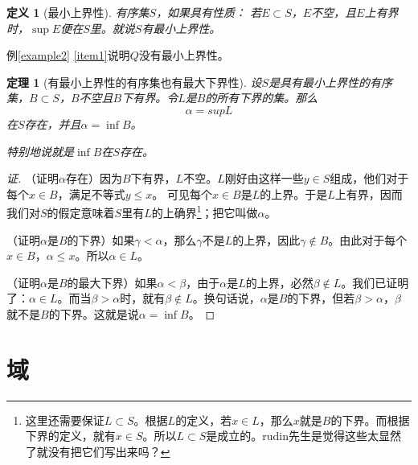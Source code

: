 \documentclass[UTF8]{ctexbook}
\newtheorem{definition}{定义}[chapter]
\newtheorem{theorem}{定理}[chapter]
\begin{document}
\begin{definition}[最小上界性]
有序集$S$，如果具有性质：
若$E \subset S$，$E$不空，且$E$上有界时，$\sup{E}$便在$S$里。就说$S$有最小上界性。
\end{definition}
例\ref{example2} \ref{item1}说明$Q$没有最小上界性。

\begin{theorem}[有最小上界性的有序集也有最大下界性]
设$S$是具有最小上界性的有序集，$B \subset S$，$B$不空且$B$下有界。令$L$是$B$的所有下界的集。那么$$\alpha = sup{L}$$在$S$存在，并且$\alpha = \inf{B}$。

特别地说就是$\inf{B}$在$S$存在。
\end{theorem}

\begin{proof}[证]
（证明$\alpha$存在）因为$B$下有界，$L$不空。$L$刚好由这样一些$y \in S$组成，他们对于每个$x \in B$，满足不等式$y \leqslant x$。
可见每个$x \in B$是$L$的上界。于是$L$上有界，因而我们对$S$的假定意味着$S$里有$L$的上确界\footnote{这里还需要保证$L \subset S$。根据$L$的定义，若$x \in L$，那么$x$就是$B$的下界。而根据下界的定义，就有$x \in S$。所以$L \subset S$是成立的。rudin先生是觉得这些太显然了就没有把它们写出来吗？}；把它叫做$\alpha$。

（证明$\alpha$是$B$的下界）如果$\gamma < \alpha$，那么$\gamma$不是$L$的上界，因此$\gamma \notin B$。由此对于每个$x \in B$，$\alpha \leqslant x$。所以$\alpha \in L$。

（证明$\alpha$是$B$的最大下界）如果$\alpha < \beta$，由于$\alpha$是$L$的上界，必然$\beta \notin L$。我们已证明了：$\alpha \in L$。而当$\beta > \alpha$时，就有$\beta \notin L$。换句话说，$\alpha$是$B$的下界，但若$\beta > \alpha$，$\beta$就不是$B$的下界。这就是说$\alpha = \inf{B}$。
\end{proof}

\section{域}
\end{document}
